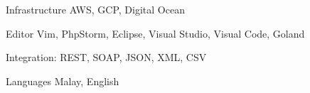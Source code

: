 \begin{cvskills}
  \cvskill
    {Infrastructure} %
    {AWS, GCP, Digital Ocean} %
    
  \cvskill
    {Editor} %
    {Vim, PhpStorm, Eclipse, Visual Studio, Visual Code, Goland} %
    
  \cvskill
    {Integration: } %
    {REST, SOAP, JSON, XML, CSV} %
    
  \cvskill
    {Languages} %
    {Malay, English} %

\end{cvskills}

